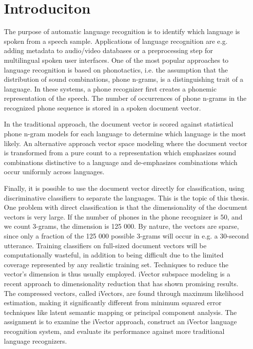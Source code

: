 \chapter{Introduciton}

The purpose of automatic language recognition is to identify which language is spoken from a speech sample. Applications of language recognition are e.g. adding metadata to audio/video databases or  a preprocessing step for multilingual spoken user interfaces. One of the most popular approaches to language recognition is based on phonotactics, i.e. the assumption that the distribution of sound combinations, phone n-grams, is a distinguishing trait of a language. In these systems, a phone recognizer first creates a phonemic representation of the speech. The number of occurrences of phone n-grams in the recognized phone sequence is stored in a spoken document vector. 

In the traditional approach, the document vector is scored against statistical phone n-gram models for each language to determine which language is the most likely. An alternative approach vector space modeling where the document vector is transformed from a pure count to a representation which emphasizes sound combinations distinctive to a language and de-emphasizes combinations which occur uniformly across languages. 

Finally, it is possible to use the document vector directly for classification, using discriminative classifiers to separate the languages. This is the topic of this thesis. One problem with direct classification is that the dimensionality of the document vectors is very large. If the number of phones in the phone recognizer is 50, and we count 3-grams, the dimension is 125 000. By nature, the vectors are sparse, since only a fraction of the 125 000 possible 3-grams will occur in e.g. a 30-second utterance. Training classifiers on full-sized document vectors will be computationally wasteful, in addition to being difficult due to the limited coverage represented by any realistic training set. Techniques to reduce the vector's dimension is thus usually employed. iVector subspace modeling is a recent approach to dimensionality reduction that has shown promising results. The compressed vectors, called iVectors, are found through maximum likelihood estimation, making it significantly different from minimum squared error techniques like latent semantic mapping or principal component analysis. The assignment is to examine the iVector approach, construct an iVector language recognition system, and evaluate its performance against more traditional language recognizers.